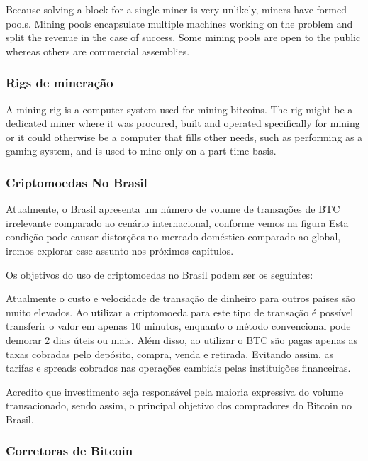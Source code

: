 \documentclass[
	article,			%
	12pt,				%
	openright,			%
	oneside,			%
	a4paper,			%
	chapter=TITLE,		%
	section=TITLE,		%
	subsection=TITLE,	%
	subsubsection=TITLE,%
	subsubsubsection=TITLE, %
	english,			%
	brazil,				%
	]{abntex2}
\begin{document}
Because solving a block for a single miner is very unlikely, miners have formed pools. Mining pools encapsulate multiple machines working on the problem and split the revenue in the case of success. Some mining pools are open to the public whereas others are commercial assemblies.

\cite{Weber2012}

\subsubsection{Rigs de mineração}

A mining rig is a computer system used for mining bitcoins. The rig might be a dedicated miner where it was procured, built and operated specifically for mining or it could otherwise be a computer that fills other needs, such as performing as a gaming system, and is used to mine only on a part-time basis.

\cite{BitcoinWiki2015}

\subsubsection{Criptomoedas No Brasil}

Atualmente, o Brasil apresenta um número de volume de transações de BTC
irrelevante comparado ao cenário internacional, conforme vemos na figura Esta condição pode causar distorções no mercado doméstico comparado ao global, iremos explorar esse assunto nos próximos capítulos.

Os objetivos do uso de criptomoedas no Brasil podem ser os seguintes:

Atualmente o custo e velocidade de transação de dinheiro para outros países são muito elevados. Ao utilizar a criptomoeda para este tipo de transação é possível transferir o valor em apenas 10 minutos, enquanto o método convencional pode demorar 2 dias úteis ou mais. Além disso, ao utilizar o BTC são pagas apenas as taxas cobradas pelo depósito, compra, venda e retirada. Evitando assim, as tarifas e spreads cobrados nas operações cambiais pelas instituições financeiras.

\cite{Prado2017}

Acredito que investimento seja responsável pela maioria expressiva do volume transacionado, sendo assim, o principal objetivo dos compradores do Bitcoin no Brasil.

\cite{Prado2017}

\subsubsection{Corretoras de Bitcoin}
\end{document}
